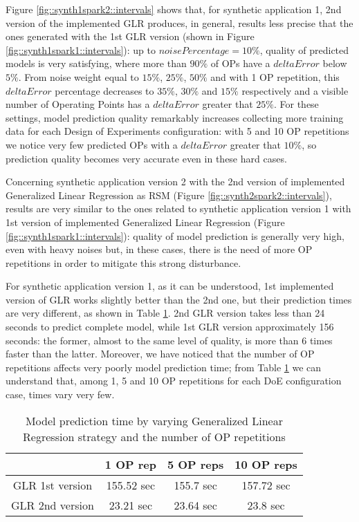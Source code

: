Figure \ref{fig::synth1spark2::intervals} shows that, for synthetic application 1, 2nd version of the implemented GLR produces, in general, results less precise that the ones generated with the 1st GLR version (shown in Figure \ref{fig::synth1spark1::intervals}): up to $noisePercentage = 10\%$, quality of predicted models is very satisfying, where more than $90\%$ of OPs have a $deltaError$ below $5\%$. From noise weight equal to $15\%$, $25\%$, $50\%$ and with 1 OP repetition, this $deltaError$ percentage decreases to $35\%$, $30\%$ and $15\%$ respectively and a visible number of Operating Points has a $deltaError$ greater that $25\%$. For these settings, model prediction quality remarkably increases collecting more training data for each Design of Experiments configuration: with 5 and 10 OP repetitions we notice very few predicted OPs with a $deltaError$ greater that $10\%$, so prediction quality becomes very accurate even in these hard cases.

Concerning synthetic application version 2 with the 2nd version of implemented Generalized Linear Regression as RSM (Figure \ref{fig::synth2spark2::intervals}), results are very similar to the ones related to synthetic application version 1 with 1st version of implemented Generalized Linear Regression (Figure \ref{fig::synth1spark1::intervals}): quality of model prediction is generally very high, even with heavy noises but, in these cases, there is the need of more OP repetitions in order to mitigate this strong disturbance.

For synthetic application version 1, as it can be understood, 1st implemented version of GLR works slightly better than the 2nd one, but their prediction times are very different, as shown in Table \ref{tab::GLRtimes}. 2nd GLR version takes less than 24 seconds to predict complete model, while 1st GLR version approximately 156 seconds: the former, almost to the same level of quality, is more than 6 times faster than the latter. Moreover, we have noticed that the number of OP repetitions affects very poorly model prediction time; from Table \ref{tab::GLRtimes} we can understand that, among 1, 5 and 10 OP repetitions for each DoE configuration case, times vary very few.

\begin{table}[t]

    \centering
    
    \begin{tabular}{cccc}
    
        \toprule
         & 1 OP rep & 5 OP reps & 10 OP reps \\
        \midrule
        GLR 1st version & 155.52 sec & 155.7 sec & 157.72 sec \\
        GLR 2nd version & 23.21 sec & 23.64 sec & 23.8 sec \\
        \bottomrule 
    
    \end{tabular}

    \caption{Model prediction time by varying Generalized Linear Regression strategy and the number of OP repetitions}
    \label{tab::GLRtimes}
    
\end{table}

